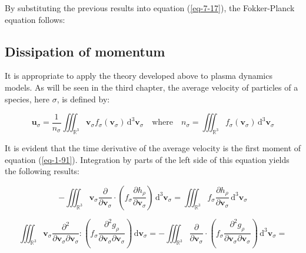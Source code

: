 By substituting the previous results into equation (\ref{eq-7-17}), the Fokker-Planck equation follows:

\subsection{Dissipation of momentum}

It is appropriate to apply the theory developed above to plasma dynamics models. As will be seen in the third chapter, the average velocity of particles of a species, here $\sigma$, is defined by:

\begin{equation}
    \mathbf{u}_\sigma=\frac{1}{n_\sigma}\iiint_{\mathbb{R}^3}\mathbf{v}_\sigma f_\sigma(\mathbf{v}_\sigma)\,\mathrm{d}^3\mathbf{v}_\sigma\quad\text{where}\quad n_\sigma=\iiint_{\mathbb{R}^3}f_\sigma(\mathbf{v}_\sigma)\,\mathrm{d}^3\mathbf{v}_\sigma
\end{equation}

It is evident that the time derivative of the average velocity is the first moment of equation (\ref{eq-1-91}). Integration by parts of the left side of this equation yields the following results:

\begin{equation}
    -\iiint_{\mathbb{R}^3}\mathbf{v}_\sigma\frac{\partial}{\partial\mathbf{v}_\sigma}\cdot\left(f_\sigma\frac{\partial h_\rho}{\partial\mathbf{v}_\sigma}\right)\,\mathrm{d}^3\mathbf{v}_\sigma=\iiint_{\mathbb{R}^3}f_\sigma\frac{\partial h_\rho}{\partial\mathbf{v}_\sigma}\,\mathrm{d}^3\mathbf{v}_\sigma
\end{equation}

\iffalse

\begin{equation*}
    \iiint_{\mathbb{R}^3}\mathbf{v}_\sigma\frac{\partial^2}{\partial\mathbf{v}_\sigma\partial\mathbf{v}_\sigma}:\left(f_\sigma\frac{\partial^2g_\rho}{\partial\mathbf{v}_\sigma\partial\mathbf{v}_\sigma}\right)\,\mathrm{d}\mathbf{v}_\sigma=-\iiint_{\mathbb{R}^3}\frac{\partial}{\partial\mathbf{v}_\sigma}\cdot\left(f_\sigma\frac{\partial^2g_\rho}{\partial\mathbf{v}_\sigma\partial\mathbf{v}_\sigma}\right)\,\mathrm{d}^3\mathbf{v}_\sigma=
\end{equation*}

